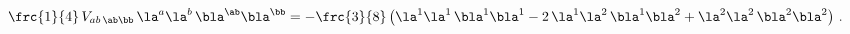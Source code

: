 \begin{equation} \label{cR_DTM}
  \frc{1}{4}\, V_{ab\,\ab\bb}\, \la^a \la^b\, \bla^\ab \bla^\bb = -
  \frc{3}{8}\, \big( \la^1 \la^1\, \bla^1 \bla^1 - 2\, \la^1 \la^2\,
  \bla^1 \bla^2 + \la^2 \la^2\, \bla^2 \bla^2 \big)\ .
 \end{equation}

